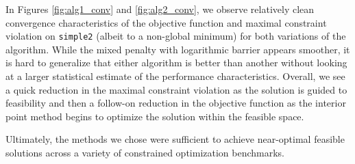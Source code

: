 \documentclass[conference]{IEEEtran}
\begin{document}
In Figures \ref{fig:alg1_conv} and \ref{fig:alg2_conv}, we observe relatively clean convergence characteristics of the objective function and maximal constraint violation on \texttt{simple2} (albeit to a non-global minimum) for both variations of the algorithm. While the mixed penalty with logarithmic barrier appears smoother, it is hard to generalize that either algorithm is better than another without looking at a larger statistical estimate of the performance characteristics. Overall, we see a quick reduction in the maximal constraint violation as the solution is guided to feasibility and then a follow-on reduction in the objective function as the interior point method begins to optimize the solution within the feasible space.

Ultimately, the methods we chose were sufficient to achieve near-optimal feasible solutions across a variety of constrained optimization benchmarks.
\end{document}
